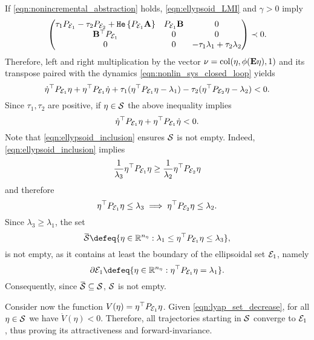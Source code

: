 \documentclass{ifacconf}
\begin{document}
{
\label{sec:proof_prp2}
If \eqref{eqn:nonincremental_abstraction} holds, \eqref{eqn:ellypsoid_LMI} and $\gamma>0$ imply
\[
    \left(\begin{matrix}\tau_1 P_{{\mathcal{E}}_1}-\tau_2 P_{{\mathcal{E}}_2}+ \texttt{\relax{He}}\left\{{P_{{\mathcal{E}}_1} {\bf{A}}}\right\}  & P_{{\mathcal{E}}_1} {\bf{B}}  & 0\\{\bf{B}}^\top P_{{\mathcal{E}}_1}  & 0 &0\\
    0 & 0 & -\tau_1 \lambda_1+\tau_2 \lambda_2\end{matrix}\right)\prec 0.
\]
Therefore, left and right multiplication by the vector $\nu=\operatorname{col}(\eta,\phi({\bf{E}}\eta),1)$ and its transpose paired with the dynamics \eqref{eqn:nonlin_sys_closed_loop}  yields
\[
\dot \eta^\top P_{{\mathcal{E}}_1} \eta + \eta^\top P_{{\mathcal{E}}_1} \dot \eta +\tau_1 (\eta^\top P_{{\mathcal{E}}_1}\eta-\lambda_1)- \tau_2 (\eta^\top P_{{\mathcal{E}}_2}\eta-\lambda_2)< 0.
\]
Since $\tau_1,\tau_2$ are positive, if $\eta\in {\mathcal{S}}$ 
the above inequality implies
\begin{equation}\label{eqn:lyap_set_decrease}
    \dot \eta^\top P_{{\mathcal{E}}_1} \eta + \eta^\top P_{{\mathcal{E}}_1} \dot \eta< 0.
\end{equation}
Note that \eqref{eqn:ellypsoid_inclusion} ensures ${\mathcal{S}}$ is not empty. Indeed, \eqref{eqn:ellypsoid_inclusion}  implies 
\[\frac{1}{\lambda_3}\eta^\top  P_{{\mathcal{E}}_1}\eta \ge \frac{1}{\lambda_2}\eta^\top  P_{{\mathcal{E}}_2}\eta 
\]
and therefore 
\[
  \eta^\top P_{{\mathcal{E}}_1}\eta\le\lambda_3\implies \eta^\top P_{{\mathcal{E}}_2}\eta\le\lambda_2.
\]
Since $\lambda_3\ge\lambda_1$, the set
\[
\overbar \cS\defeq\{\eta\in\RR^{n_\eta}: \lambda_1\le \eta^\top P_{\cE_1}\eta\le\lambda_3\},
\]
is not empty, as it contains at least the boundary of the ellipsoidal set ${\mathcal{E}}_1$, namely
\[
\partial \cE_1\defeq\{\eta\in\RR^{n_\eta}: \eta^\top P_{\cE_1}\eta=\lambda_1 \}.
\]
Consequently, since $\overbar \cS\subseteq\cS$, ${\mathcal{S}}$ is not empty.

Consider now the function $V(\eta)=\eta^\top P_{{\mathcal{E}}_1} \eta$.  Given \eqref{eqn:lyap_set_decrease}, for all $\eta \in {\mathcal{S}}$ we have $\dot V(\eta) < 0$. Therefore, all trajectories starting in ${\mathcal{S}}$ converge to ${\mathcal{E}}_1$, thus proving its attractiveness and forward-invariance.}
\end{document}
